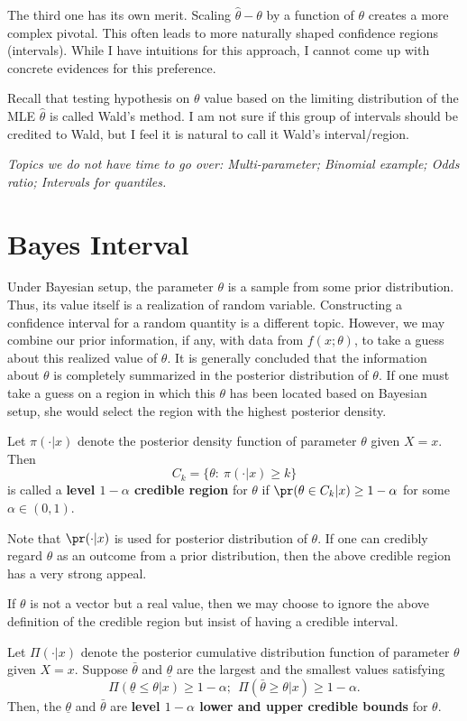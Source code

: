 The third one has its own merit. Scaling $\hat \theta - \theta$ by a function
of $\theta$ creates a more complex pivotal. This often leads to more naturally
shaped confidence regions (intervals). While I have intuitions for this approach,
I cannot come up with concrete evidences for this preference.

Recall that testing hypothesis on $\theta$ value based on the limiting
distribution of the MLE $\hat \theta$ is called Wald's method. I am not sure
if this group of intervals should be credited to Wald, but I feel it is natural
to call it Wald's interval/region.

{\it 
Topics we do not have time to go over:
Multi-parameter; Binomial example; Odds ratio; Intervals for quantiles.}

\section{Bayes Interval}

Under Bayesian setup, the parameter $\theta$ is a sample from some
prior distribution. Thus, its value itself is a realization of random variable.
Constructing a confidence interval for a random quantity is a different topic.
However, we may combine our prior information,
if any, with data from $f(x; \theta)$, to take a guess about this realized value of $\theta$.
It is generally concluded that
the information about $\theta$ is completely summarized in the posterior distribution of $\theta$.
If one must take a guess on a region in which this $\theta$ has been
located based on Bayesian setup, she would select the region with
the highest posterior density.

\begin{defi}
Let $\pi(\cdot | x)$ denote the posterior density function of parameter $\theta$
given $X = x$. Then
\[
C_k = \{ \theta:~ \pi(\cdot | x) \geq k\}
\]
is called a {\bf level $1-\alpha$ credible region} for $\theta$ if
$\pr(\theta \in C_k | x) \geq 1 - \alpha$
for some $\alpha \in (0, 1)$.
\end{defi}

Note that $\pr(\cdot | x)$ is used for posterior distribution of $\theta$.
If one can credibly regard $\theta$ as an outcome from a prior distribution,
then the above credible region has a very strong appeal.

If $\theta$ is not a vector but a real value, then we may choose to ignore
the above definition of the credible region but insist of having a credible interval.
\begin{defi}
Let $\Pi(\cdot | x)$ denote the posterior cumulative distribution function of parameter $\theta$
given $X = x$. Suppose $\bar \theta$ and $\underline{ \theta}$ are
the largest and the smallest values satisfying
\[
\Pi(\underline{\theta} \leq \theta | x) \geq 1 - \alpha;~~
\Pi(\bar{\theta} \geq \theta | x) \geq 1 - \alpha.
\]
Then, the $\underline{\theta}$ and $\bar{\theta}$
are {\bf level $1-\alpha$ lower and upper credible bounds} for $\theta$.
\end{defi}


